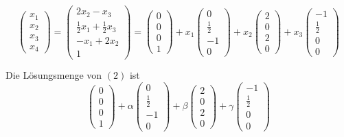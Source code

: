 \documentclass[a4paper,12pt]{article}
\begin{document}
\[
    \begin{pmatrix}
        x_1 \\x_2\\x_3\\x_4
    \end{pmatrix}=\begin{pmatrix}
        2x_2-x_3 \\\frac12x_1+\frac12x_3\\-x_1+2x_2\\1
    \end{pmatrix}=\begin{pmatrix}
        0 \\0\\0\\1
    \end{pmatrix}+x_1\begin{pmatrix}
        0 \\\frac12\\-1\\0
    \end{pmatrix}+x_2\begin{pmatrix}
        2 \\0\\2\\0
    \end{pmatrix}+x_3\begin{pmatrix}
        -1 \\\frac12\\0\\0
    \end{pmatrix}
\]

Die Lösungsmenge von $(2)$ ist \[
    \begin{pmatrix}
        0 \\0\\0\\1
    \end{pmatrix}+\alpha\begin{pmatrix}
        0 \\\frac12\\-1\\0
    \end{pmatrix}+\beta\begin{pmatrix}
        2 \\0\\2\\0
    \end{pmatrix}+\gamma\begin{pmatrix}
        -1 \\\frac12\\0\\0
    \end{pmatrix}\]
\end{document}
